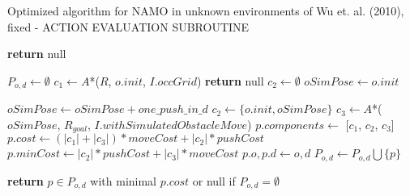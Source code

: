 \begin{algorithm}[H]

  \caption{Optimized algorithm for NAMO in unknown environments of Wu et. al. (2010), fixed - ACTION EVALUATION SUBROUTINE}

  \label{alg:01-wu-optevaluateaction}

  \begin{algorithmic}[1]


        \State \textbf{return} null
      \EndIf

      \State $P_{o,d} \gets \emptyset$
      \State $c_{1} \gets A$*($R$, $o.init$, $I.occGrid$) \label{lst:line:obstacle_pushpose_note}
       \label{lst:line:c1_note}
        \State \textbf{return} null
      \EndIf
      \State $c_{2} \gets \emptyset$
      \State $oSimPose \gets o.init$

       \label{lst:line:bound_note}
        \State $oSimPose \gets oSimPose + one\_push\_in\_d$
          \State $c_{2} \gets \{o.init, oSimPose\}$ \label{lst:line:c2_note}
          \State $c_{3} \gets A$*($oSimPose$, $R_{goal}$, $I.withSimulatedObstacleMove$)
           \label{lst:line:c3_note}
            \State $p.components \gets$ [$c_{1}$, $c_{2}$, $c_{3}$]
            \State $p.cost \gets (|c_{1}| + |c_{3}|) * moveCost + |c_{2}| * pushCost$
            \State $p.minCost \gets |c_{2}| * pushCost + |c_{3}| * moveCost$
            \State $p.o, p.d \gets o, d$
            \State $P_{o,d} \gets P_{o,d} \bigcup \{p\}$
          \EndIf
        \EndIf
      \EndWhile

      \State \textbf{return} $p \in P_{o,d}$ with minimal $p.cost$ or null if $P_{o,d} = \emptyset$

    \EndProcedure

  \end{algorithmic}

\end{algorithm}

